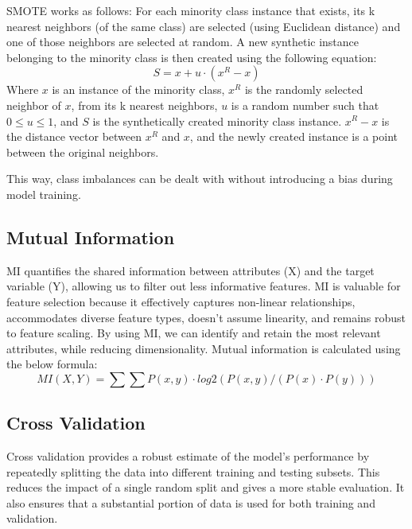 \documentclass{article}
\begin{document}
SMOTE works as follows:
For each minority class instance that exists, its k nearest neighbors (of the same class) are selected (using Euclidean distance) and one of those neighbors are selected at random.
A new synthetic instance belonging to the minority class is then created using the following equation:
$$ S = x+u \cdot (x^R - x)$$
Where $x$ is an instance of the minority class, $x^R$ is the randomly selected neighbor of $x$, from its k nearest neighbors, $u$ is a random number such that $0 \leq u \leq 1$, and $S$ is the synthetically created minority class instance.
$x^R - x$ is the distance vector between $x^R$ and $x$, and the newly created instance is a point between the original neighbors.

This way, class imbalances can be dealt with without introducing a bias during model training.

\subsection{Mutual Information}
\label{ssec:mutual-information}

MI quantifies the shared information between attributes (X) and the target variable (Y), allowing us to filter out less informative features. 
MI is valuable for feature selection because it effectively captures non-linear relationships, accommodates diverse feature types, doesn't assume linearity, and remains robust to feature scaling. 
By using MI, we can identify and retain the most relevant attributes, while reducing dimensionality.
Mutual information is calculated using the below formula:
$$MI(X, Y) = \sum \sum P(x, y) \cdot log2(P(x, y) / (P(x) \cdot P(y)))$$


\subsection{Cross Validation}
\label{ssec:cross-validation}

Cross validation provides a robust estimate of the model's performance by repeatedly splitting the data into different training and testing subsets. This reduces the impact of a single random split and gives a more stable evaluation. It also ensures that a substantial portion of data is used for both training and validation.
\end{document}
